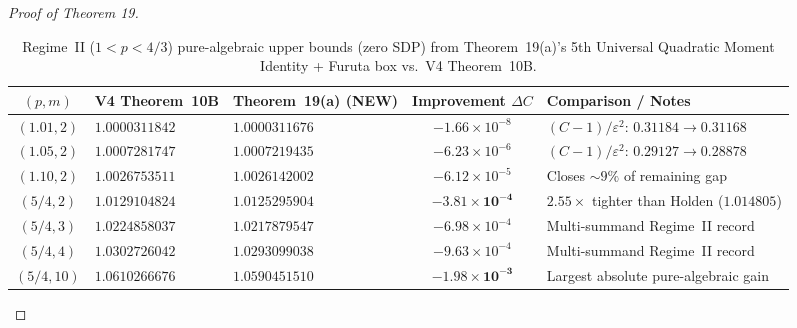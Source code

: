 \documentclass[10pt,letterpaper]{article}
\begin{document}
\begin{proof}[Proof of Theorem 19]
\begin{table}[htbp]
\centering
\caption{\small Regime~II ($1 < p < 4/3$) pure-algebraic upper bounds (zero SDP) from Theorem~19(a)'s 5th Universal Quadratic Moment Identity + Furuta box vs.\ V4 Theorem~10B.}
\vspace{3pt}
\footnotesize
\setlength{\tabcolsep}{4.5pt}
\begin{tabular}{@{}c l l c l@{}}
\toprule
\textbf{$(p, m)$} & \textbf{V4 Theorem~10B} & \textbf{Theorem~19(a) (NEW)} & \textbf{Improvement $\Delta C$} & \textbf{Comparison / Notes} \\
\midrule
$(1.01, 2)$ & $1.0000311842$ & $\mathbf{1.0000311676}$ & $-1.66\times 10^{-8}$ & $(C-1)/\varepsilon^2$: $0.31184 \to 0.31168$ \\
$(1.05, 2)$ & $1.0007281747$ & $\mathbf{1.0007219435}$ & $-6.23\times 10^{-6}$ & $(C-1)/\varepsilon^2$: $0.29127 \to 0.28878$ \\
$(1.10, 2)$ & $1.0026753511$ & $\mathbf{1.0026142002}$ & $-6.12\times 10^{-5}$ & Closes $\sim 9\%$ of remaining gap \\
$(5/4, 2)$  & $1.0129104824$ & $\mathbf{1.0125295904}$ & $\mathbf{-3.81\times 10^{-4}}$ & $\mathbf{2.55\times}$ tighter than Holden ($1.014805$) \\
$(5/4, 3)$  & $1.0224858037$ & $\mathbf{1.0217879547}$ & $-6.98\times 10^{-4}$ & Multi-summand Regime~II record \\
$(5/4, 4)$  & $1.0302726042$ & $\mathbf{1.0293099038}$ & $-9.63\times 10^{-4}$ & Multi-summand Regime~II record \\
$(5/4, 10)$ & $1.0610266676$ & $\mathbf{1.0590451510}$ & $\mathbf{-1.98\times 10^{-3}}$ & Largest absolute pure-algebraic gain \\
\bottomrule
\end{tabular}
\label{tab:regime2}
\end{table}


\end{proof}
\end{document}
